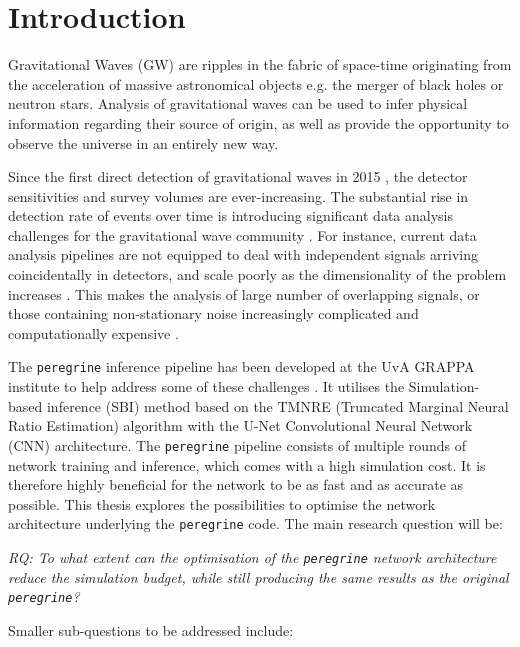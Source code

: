 \section{Introduction}
\label{sec:introduction}

Gravitational Waves (GW) are ripples in the fabric of space-time originating from the acceleration of massive astronomical objects e.g. the merger of black holes or neutron stars. 
Analysis of gravitational waves can be used to infer physical information regarding their source of origin, as well as provide the opportunity to observe the universe in an entirely new way.

Since the first direct detection of gravitational waves in 2015 \cite{LIGO_2016}, the detector sensitivities and survey volumes are ever-increasing. The substantial rise in detection rate of events over time is introducing significant data analysis challenges for the gravitational wave community \cite{bhardwaj2023peregrine}.
For instance, current data analysis pipelines are not equipped to deal with independent signals arriving coincidentally in detectors, and scale poorly as the dimensionality of the problem increases \cite{alvey2023things}. This makes the analysis of large number of overlapping signals, or those containing non-stationary noise increasingly complicated and computationally expensive \cite{bhardwaj2023peregrine}.

The \texttt{peregrine} inference pipeline has been developed at the UvA GRAPPA institute to help address some of these challenges \cite{bhardwaj2023peregrine}. It utilises the Simulation-based inference (SBI) method based on the TMNRE (Truncated Marginal Neural Ratio Estimation) algorithm with the U-Net Convolutional Neural Network (CNN) architecture. The \texttt{peregrine} pipeline consists of multiple rounds of network training and inference, which comes with a high simulation cost. It is therefore highly beneficial for the network to be as fast and as accurate as possible. This thesis explores the possibilities to optimise the network architecture underlying the \texttt{peregrine} code. The main research question will be: 

\noindent \textit{RQ: To what extent can the optimisation of the \texttt{peregrine} network architecture reduce the simulation budget, while still producing the same results as the original \texttt{peregrine}?}

Smaller sub-questions to be addressed include:

